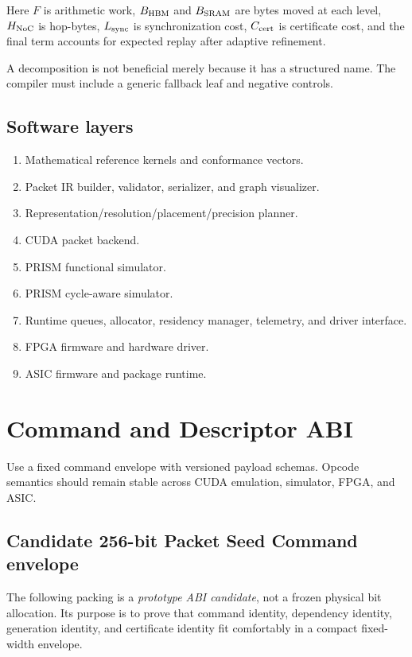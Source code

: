\documentclass[10pt,letterpaper]{article}
\begin{document}
Here $F$ is arithmetic work, $B_{\rm HBM}$ and $B_{\rm SRAM}$ are bytes moved at each level, $H_{\rm NoC}$ is hop-bytes, $L_{\rm sync}$ is synchronization cost, $C_{\rm cert}$ is certificate cost, and the final term accounts for expected replay after adaptive refinement.

A decomposition is not beneficial merely because it has a structured name. The compiler must include a generic fallback leaf and negative controls.

\subsection{Software layers}

\begin{enumerate}
\item Mathematical reference kernels and conformance vectors.
\item Packet IR builder, validator, serializer, and graph visualizer.
\item Representation/resolution/placement/precision planner.
\item CUDA packet backend.
\item PRISM functional simulator.
\item PRISM cycle-aware simulator.
\item Runtime queues, allocator, residency manager, telemetry, and driver interface.
\item FPGA firmware and hardware driver.
\item ASIC firmware and package runtime.
\end{enumerate}

\section{Command and Descriptor ABI}

Use a fixed command envelope with versioned payload schemas. Opcode semantics should remain stable across CUDA emulation, simulator, FPGA, and ASIC.

\subsection{Candidate 256-bit Packet Seed Command envelope}

The following packing is a \emph{prototype ABI candidate}, not a frozen physical bit allocation. Its purpose is to prove that command identity, dependency identity, generation identity, and certificate identity fit comfortably in a compact fixed-width envelope.
\end{document}
